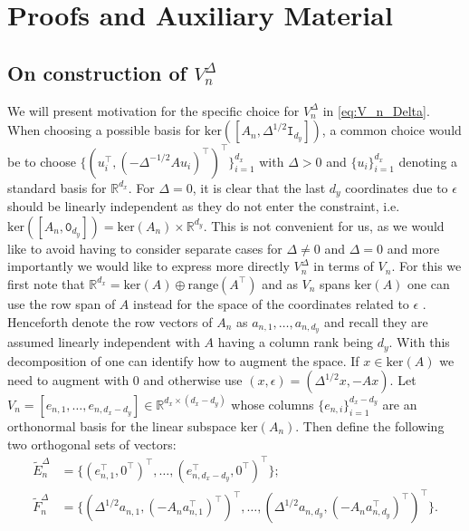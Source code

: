 \documentclass[english,13pt]{article}
\numberwithin{equation}{section}
\begin{document}
\appendix

\section{Proofs and Auxiliary Material}\label{app:proof}

\subsection{On construction of $V_n^\Delta$}

We will present motivation for the specific choice for $V_n^{\Delta}$ in \eqref{eq:V_n_Delta}. When choosing a possible basis for $\text{ker}([A_n,\Delta^{1/2}\mathtt{I}_{d_y}])$, a common choice would be to choose $\{\left(u_i^\top,(-{\Delta}^{-1/2}Au_i)^\top\right)^\top\}_{i=1}^{d_x}$ with $\Delta>0$ and $\{u_i\}_{i=1}^{d_x}$ denoting a standard basis for $\mathbb{R}^{d_x}$. For $\Delta=0$, it is clear that the last $d_y$ coordinates due to $\epsilon$ should be linearly independent as they do not enter the constraint, i.e. $\text{ker}([A_n,\mathtt{0}_{d_y}])=\text{ker}(A_n)\times\mathbb{R}^{d_y}$. This is not convenient for us, as we would like to avoid having to consider separate cases for $\Delta\neq0$ and $\Delta=0$ and more importantly we would like to express more directly $V_n^\Delta$ in terms of $V_n$. For this we first note that $\mathbb{R}^{d_x}=\text{ker}(A)\oplus\text{range}(A^{\top})$ and as $V_n$ spans $\text{ker}(A)$ one can use the row span of $A$ instead  for the space of the coordinates related to $\epsilon$ . Henceforth denote the row vectors of $A_n$ as  $a_{n,1},\ldots, a_{n,{d_y}}$ and recall they are assumed linearly independent with $A$ having a column rank being $d_y$. With this decomposition of one can identify how to augment the space. If $x\in\text{ker}(A)$ we need to augment with $0$ and otherwise use $(x,\epsilon)=(\Delta^{1/2}x,-Ax)$. Let $V_n=[ e_{n,1},\ldots, e_{n,d_x-d_y} ]\in \mathbb{R}^{d_x\times(d_x-d_y)}$ whose columns $\{e_{n,i}\}_{i=1}^{d_x-d_y}$ are an orthonormal basis for the linear subspace $ \text{ker}(A_n)$. Then define the following two {orthogonal} sets of vectors: 
%
\begin{align*}
\widetilde{E}_n^{\Delta} &=\big\{ (e_{n,1}^{\top},0^{\top})^{\top},\ldots,   (e_{n,d_x-d_y}^{\top},0^{\top})^{\top}\big\};
 \\
\widetilde{F}_n^{\Delta} & = \big\{ (\Delta^{1/2}a_{n,1}, (-A_n a_{n,1}^{\top})^{\top})^{\top},\ldots, (\Delta^{1/2}a_{n,d_y}, (-A_n a_{n,d_y}^{\top})^{\top})^{\top}\big\}. 
\end{align*}
\end{document}
